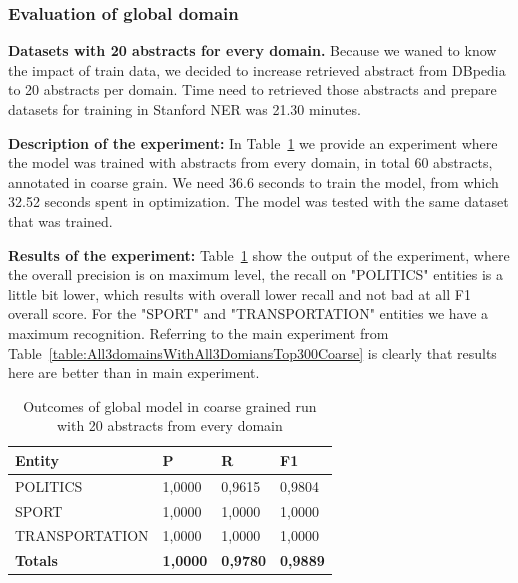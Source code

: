 \documentclass[thesis=M,english]{FITthesis}[2018/05/30]
\begin{document}
\subsubsection{Evaluation of global domain}
\textbf{Datasets with 20 abstracts for every domain.} Because we waned to know the impact of train data, we decided to increase retrieved abstract from DBpedia to 20 abstracts per domain. Time need to retrieved those abstracts and prepare datasets for training in Stanford NER was 21.30 minutes.

\textbf{Description of the experiment:} In Table~\ref{table:GlobalDomainWithAllAbstractsTop20Coarse} we provide an experiment where the model was trained with abstracts from every domain, in total 60 abstracts, annotated in coarse grain. We need 36.6 seconds to train the model, from which 32.52 seconds spent in optimization. The model was tested with the same dataset that was trained.    

\textbf{Results of the experiment:} Table~\ref{table:GlobalDomainWithAllAbstractsTop20Coarse} show the output of the experiment, where the overall precision is on maximum level, the recall on "POLITICS" entities is a little bit lower, which results with overall lower recall and not bad at all F1 overall score. For the "SPORT" and "TRANSPORTATION" entities we have a maximum recognition. Referring to the main experiment from Table~\ref{table:All3domainsWithAll3DomiansTop300Coarse} is clearly that results here are better than in main experiment.

	\begin{table}[H]\centering
		\begin{tabular}{|l|l|l|l|}
			\hline {\textbf{Entity}} & {\textbf{P}} & {\textbf{R}} & {\textbf{F1}}\\\hline
				POLITICS & 1,0000 & 0,9615 & 0,9804\\
				SPORT & 1,0000 & 1,0000 & 1,0000\\
				TRANSPORTATION & 1,0000 & 1,0000 & 1,0000\\\hline
				\textbf{Totals} & \textbf{1,0000} & \textbf{0,9780} & \textbf{0,9889}\\\hline
		\end{tabular}
		\caption{Outcomes of global model in coarse grained run with 20 abstracts from every domain \label{table:GlobalDomainWithAllAbstractsTop20Coarse}}
	\end{table}
\end{document}
